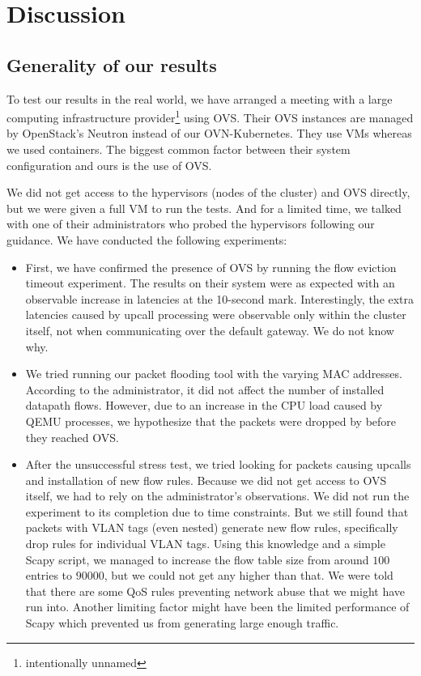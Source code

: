 \chapter{Discussion}
\label{chap:discussion}

\section{Generality of our results}

To test our results in the real world, we have arranged a meeting with a large computing infrastructure provider\footnote{intentionally unnamed} using OVS. Their OVS instances are managed by OpenStack's Neutron \cite{Neutron} instead of our OVN-Kubernetes. They use VMs whereas we used containers. The biggest common factor between their system configuration and ours is the use of OVS.

We did not get access to the hypervisors (nodes of the cluster) and OVS directly, but we were given a full VM to run the tests. And for a limited time, we talked with one of their administrators who probed the hypervisors following our guidance. We have conducted the following experiments:

\begin{itemize}
    \item First, we have confirmed the presence of OVS by running the flow eviction timeout experiment. The results on their system were as expected with an observable increase in latencies at the 10-second mark. Interestingly, the extra latencies caused by upcall processing were observable only within the cluster itself, not when communicating over the default gateway. We do not know why.
    
    \item We tried running our packet flooding tool with the varying MAC addresses. According to the administrator, it did not affect the number of installed datapath flows. However, due to an increase in the CPU load caused by QEMU processes, we hypothesize that the packets were dropped by  before they reached OVS.

    \item After the unsuccessful stress test, we tried looking for packets causing upcalls and installation of new flow rules. Because we did not get access to OVS itself, we had to rely on the administrator's observations. We did not run the experiment to its completion due to time constraints. But we still found that packets with VLAN tags (even nested) generate new flow rules, specifically drop rules for individual VLAN tags. Using this knowledge and a simple Scapy script, we managed to increase the flow table size from around $100$ entries to $90000$, but we could not get any higher than that. We were told that there are some QoS rules preventing network abuse that we might have run into. Another limiting factor might have been the limited performance of Scapy which prevented us from generating large enough traffic.
\end{itemize} 

